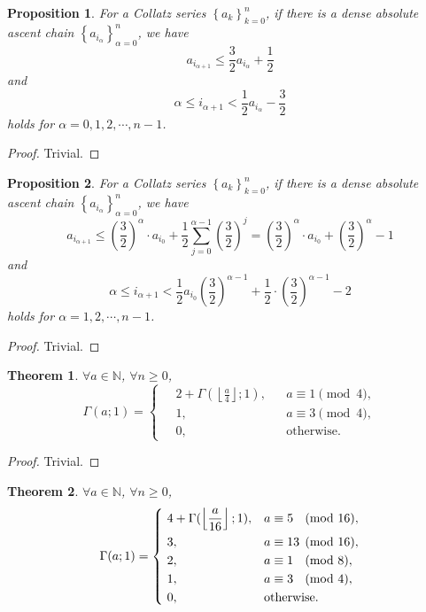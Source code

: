\documentclass[a4paper,12pt]{article}
\theoremstyle{sltheorem}
\newtheorem{theorem}{Theorem}
\newtheorem{proposition}{Proposition}
\newcommand{\floor}[1]{\left\lfloor#1\right\rfloor}
\begin{document}
\vspace*{2em}
\begin{proposition}
	For a Collatz series $\left\{a_k\right\}_{k=0}^{n}$, if there is a dense absolute ascent chain $\left\{a_{i_\alpha}\right\}_{\alpha=0}^{n}$, we have
    \[ a_{i_{\alpha+1}} \le \frac{3}{2}a_{i_\alpha} + \frac{1}{2} \]
    and
    \[ \alpha \le i_{\alpha+1} < \frac{1}{2}a_{i_\alpha}  - \frac{3}{2} \]
    holds for $\alpha = 0, 1, 2, \cdots, n - 1$.
\end{proposition}
\begin{proof} Trivial. \end{proof}
\begin{proposition}
    For a Collatz series $\left\{a_k\right\}_{k=0}^{n}$, if there is a dense absolute ascent chain $\left\{a_{i_\alpha}\right\}_{\alpha=0}^{n}$, we have
    \[ a_{i_{\alpha+1}} \le \left(\frac{3}{2}\right)^{\alpha}\cdot a_{i_0} + \frac{1}{2}\sum_{j=0}^{\alpha-1}\left(\frac{3}{2}\right)^{j} = \left(\frac{3}{2}\right)^{\alpha}\cdot a_{i_0} + \left(\frac{3}{2}\right)^{\alpha} - 1 \]
    and
    \[ \alpha \le i_{\alpha+1} < \frac{1}{2}a_{i_0} \left(\frac{3}{2}\right)^{\alpha-1} + \frac{1}{2}\cdot\left(\frac{3}{2}\right)^{\alpha-1} - 2 \]
    holds for $\alpha = 1, 2, \cdots, n - 1$.
\end{proposition}
\begin{proof} Trivial. \end{proof}
\begin{theorem}
    $\forall a \in \mathbb{N}$, $\forall n \ge 0$,
    \[\Gamma(a;1) = \left\{\ \begin{aligned}
        & 2 + \Gamma(\floor{\frac{a}{4}};1),  & & a \equiv 1 \pmod{4}, \\
        & 1,                & & a \equiv 3 \pmod{4}, \\
        & 0,                & & \text{otherwise} .
    \end{aligned}\right.\]
\end{theorem}
\begin{proof} Trivial. \end{proof}
\begin{theorem}
    $\forall a \in \mathbb{N}$, $\forall n \ge 0$,
    \[\Gamma(a;1) = \left\{\ \begin{aligned}
        & 4 + \Gamma(\floor{\frac{a}{16}};1),  & & a \equiv 5 \hspace{0.5em}\pmod{16}, \\
        & 3,                & & a \equiv 13 \pmod{16}, \\
        & 2,                & & a \equiv 1 \hspace{0.5em}\pmod{8}, \\
        & 1,                & & a \equiv 3 \hspace{0.5em}\pmod{4}, \\
        & 0,                & & \text{otherwise} .
    \end{aligned}\right.\]
\end{theorem}
\end{document}
